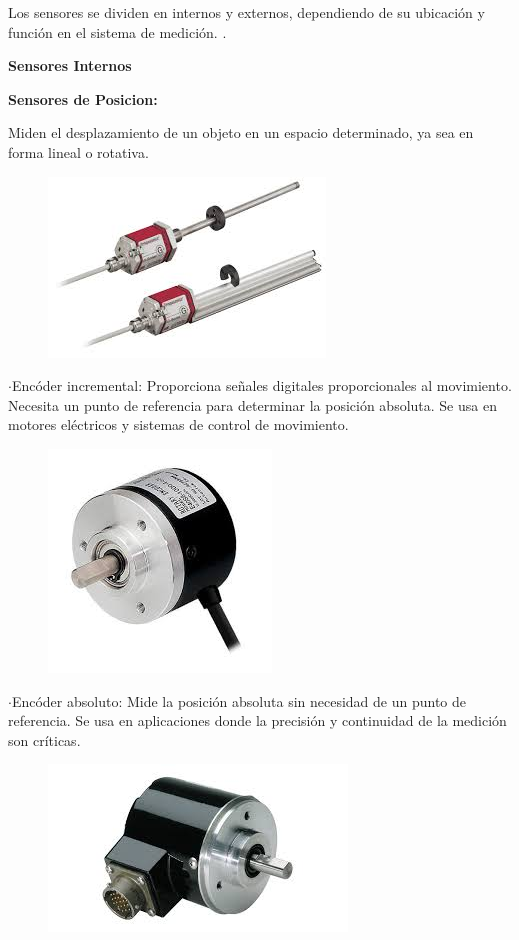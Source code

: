 Los sensores se dividen en internos y externos, dependiendo de su ubicación y función en el sistema de medición. \cite{siciliano2016springer}.


\textbf{Sensores Internos}


\textbf{Sensores de Posicion:}


	Miden el desplazamiento de un objeto en un espacio determinado, ya sea en forma lineal o rotativa.
	

\begin{figure} [h]
	\centering
	\includegraphics[width=0.3\linewidth]{img/sensorposicion}
	\caption{}
	\label{fig:sensorposicion}
\end{figure}


	$\cdot$Encóder incremental: Proporciona señales digitales proporcionales al movimiento. Necesita un punto de referencia para determinar la posición absoluta. Se usa en motores eléctricos y sistemas de control de movimiento.
	
	
\begin{figure} [h]
	\centering
	\includegraphics[width=0.3\linewidth]{img/encoderincremental}
	\caption{}
	\label{fig:encoderincremental}
\end{figure}

\newpage
	$\cdot$Encóder absoluto: Mide la posición absoluta sin necesidad de un punto de referencia. Se usa en aplicaciones donde la precisión y continuidad de la medición son críticas.


\begin{figure} [h]
	\centering
	\includegraphics[width=0.3\linewidth]{img/encoderabsoluto}
	\caption{}
	\label{fig:encoderabsoluto}
\end{figure}


